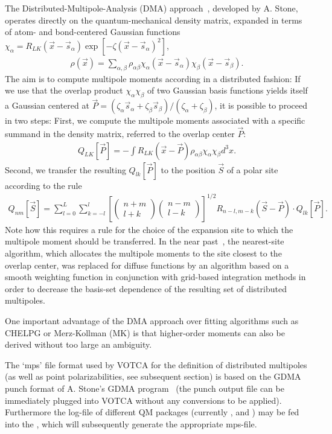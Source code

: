 The Distributed-Multipole-Analysis (DMA) approach~\cite{stone_distributed_1985, stone_distributed_2005}, developed by A. Stone, operates directly on the quantum-mechanical density matrix, expanded in terms of atom- and bond-centered Gaussian functions $\chi_\alpha = R_{LK}(\vec{x}-\vec{s}_\alpha) \exp[-\zeta(\vec{x}-\vec{s}_\alpha)^2]$,
\begin{align}
 \rho(\vec{x}) = \sum_{\alpha,\beta} \rho_{\alpha\beta} \chi_\alpha(\vec{x}-\vec{s}_\alpha) \chi_\beta(\vec{x}-\vec{s}_\beta). 
\end{align}
The aim is to compute multipole moments according in a distributed fashion: If we use that the overlap product $\chi_\alpha \chi_\beta$ of two Gaussian basis functions yields itself a Gaussian centered at $\vec{P} = (\zeta_\alpha \vec{s}_\alpha + \zeta_\beta \vec{s}_\beta) / (\zeta_\alpha + \zeta_\beta)$, it is possible to proceed in two steps: First, we compute the multipole moments associated with a specific summand in the density matrix, referred to the overlap center $\vec{P}$:
\begin{align}
 Q_{LK}[\vec{P}] = - \int R_{LK}(\vec{x}-\vec{P}) \rho_{\alpha\beta} \chi_\alpha \chi_\beta d^3\!x.
\end{align}
Second, we transfer the resulting $Q_{lk}[\vec{P}]$ to the position $\vec{S}$ of a polar site according to the rule~\cite{stone_distributed_1985}
\begin{align}
 Q_{nm}[\vec{S}] = \sum_{l=0}^L \sum_{k=-l}^l \left[ \left(\begin{array}{c} n+m \\ l+k \end{array}\right)\left(\begin{array}{c} n-m \\ l-k \end{array}\right) \right]^{1/2} R_{n-l,m-k}(\vec{S}-\vec{P})\cdot Q_{lk}[\vec{P}].
\end{align}
Note how this requires a rule for the choice of the expansion site to which the multipole moment should be transferred. In the near past~\cite{stone_distributed_2005}, the nearest-site algorithm, which allocates the multipole moments to the site closest to the overlap center, was replaced for diffuse functions by an algorithm based on a smooth weighting function in conjunction with grid-based integration methods in order to decrease the basis-set dependence of the resulting set of distributed multipoles.

One important advantage of the DMA approach over fitting algorithms such as CHELPG or Merz-Kollman (MK) is that higher-order moments can also be derived without too large an ambiguity.

The `mps' file format used by VOTCA for the definition of distributed multipoles (as well as point polarizabilities, see subsequent section) is based on the GDMA punch format of A. Stone's GDMA program~\cite{stone_distributed_2005} (the punch output file can be immediately plugged into VOTCA without any conversions to be applied). Furthermore the log-file of different QM packages (currently \gaussian, \turbomole and \nwchem) may be fed into the  \tool, which will subsequently generate the appropriate mps-file.

